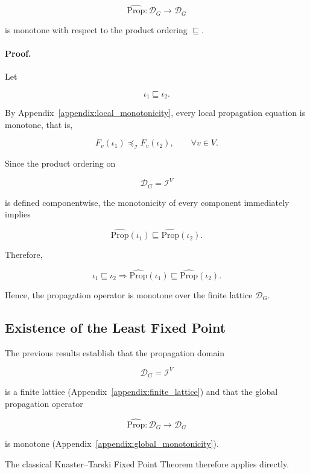 \documentclass[10pt]{article}
\begin{document}
\[
\widehat{\mathrm{Prop}}
:
\mathcal D_G
\rightarrow
\mathcal D_G
\]

is monotone with respect to the product ordering
$\sqsubseteq$.

\paragraph{Proof.}

Let

\[
\iota_1
\sqsubseteq
\iota_2.
\]

By Appendix~\ref{appendix:local_monotonicity}, every local propagation equation is monotone, that is,

\[
F_v(\iota_1)
\preceq_{\mathcal I}
F_v(\iota_2),
\qquad
\forall v\in V.
\]

Since the product ordering on

\[
\mathcal D_G
=
\mathcal I^{V}
\]

is defined componentwise, the monotonicity of every component immediately implies

\[
\widehat{\mathrm{Prop}}(\iota_1)
\sqsubseteq
\widehat{\mathrm{Prop}}(\iota_2).
\]

Therefore,

\begin{equation}
	\label{eq:global_monotonicity}
	\iota_1
	\sqsubseteq
	\iota_2
	\Longrightarrow
	\widehat{\mathrm{Prop}}(\iota_1)
	\sqsubseteq
	\widehat{\mathrm{Prop}}(\iota_2).
\end{equation}

Hence, the propagation operator is monotone over the finite lattice
$\mathcal D_G$.

\subsection{Existence of the Least Fixed Point}

The previous results establish that the propagation domain

\[
\mathcal D_G
=
\mathcal I^{V}
\]

is a finite lattice (Appendix~\ref{appendix:finite_lattice}) and that the global propagation operator

\[
\widehat{\mathrm{Prop}}
:
\mathcal D_G
\rightarrow
\mathcal D_G
\]

is monotone (Appendix~\ref{appendix:global_monotonicity}).

The classical Knaster--Tarski Fixed Point Theorem therefore applies directly.
\end{document}
